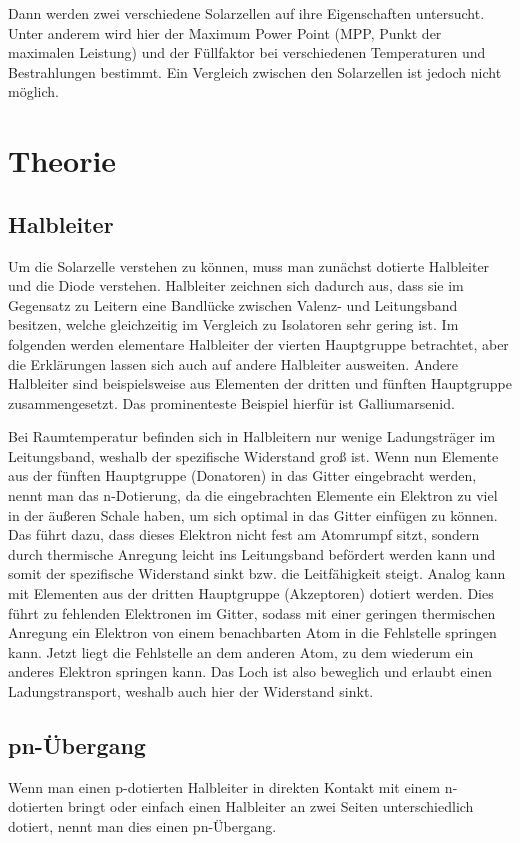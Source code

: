 \documentclass[
	a4paper,
	12pt,
	pagesize,
	ngerman
]{scrartcl}
\begin{document}
	Dann werden zwei verschiedene Solarzellen auf ihre Eigenschaften untersucht.
	Unter anderem wird hier der Maximum Power Point (MPP, Punkt der maximalen Leistung) und der Füllfaktor bei verschiedenen Temperaturen und Bestrahlungen bestimmt.
	Ein Vergleich zwischen den Solarzellen ist jedoch nicht möglich.

  \section{Theorie}

	\subsection{Halbleiter}
	Um die Solarzelle verstehen zu können, muss man zunächst dotierte Halbleiter und die Diode verstehen.
	Halbleiter zeichnen sich dadurch aus, dass sie im Gegensatz zu Leitern eine Bandlücke zwischen Valenz- und Leitungsband besitzen, welche gleichzeitig im Vergleich zu Isolatoren sehr gering ist.
	Im folgenden werden elementare Halbleiter der vierten Hauptgruppe betrachtet, aber die Erklärungen lassen sich auch auf andere Halbleiter ausweiten.
	Andere Halbleiter sind beispielsweise aus Elementen der dritten und fünften Hauptgruppe zusammengesetzt.
	Das prominenteste Beispiel hierfür ist Galliumarsenid.

	Bei Raumtemperatur befinden sich in Halbleitern nur wenige Ladungsträger im Leitungsband, weshalb der spezifische Widerstand groß ist.
	Wenn nun Elemente aus der fünften Hauptgruppe (Donatoren) in das Gitter eingebracht werden, nennt man das n-Dotierung, da die eingebrachten Elemente ein Elektron zu viel in der äußeren Schale haben, um sich optimal in das Gitter einfügen zu können.
	Das führt dazu, dass dieses Elektron nicht fest am Atomrumpf sitzt, sondern durch thermische Anregung leicht ins Leitungsband befördert werden kann und somit der spezifische Widerstand sinkt bzw. die Leitfähigkeit steigt.
	Analog kann mit Elementen aus der dritten Hauptgruppe (Akzeptoren) dotiert werden.
	Dies führt zu fehlenden Elektronen im Gitter, sodass mit einer geringen thermischen Anregung ein Elektron von einem benachbarten Atom in die Fehlstelle springen kann.
	Jetzt liegt die Fehlstelle an dem anderen Atom, zu dem wiederum ein anderes Elektron springen kann.
	Das Loch ist also beweglich und erlaubt einen Ladungstransport, weshalb auch hier der Widerstand sinkt.

	\subsection{pn-Übergang}
	Wenn man einen p-dotierten Halbleiter in direkten Kontakt mit einem n-dotierten bringt oder einfach einen Halbleiter an zwei Seiten unterschiedlich dotiert, nennt man dies einen pn-Übergang.
\end{document}
